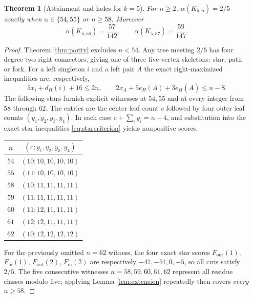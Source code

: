 \documentclass[11pt,a4paper]{article}
\newtheorem{theorem}{Theorem}[section]
\newcommand{\al}{\alpha}
\newcommand{\KK}[2]{K_{#1,#2}}
\begin{document}
\begin{theorem}[Attainment and holes for $k=5$]\label{thm:k5}
For $n\ge2$, $\al(\KK{5}{n})=2/5$ exactly when $n\in\{54,55\}$ or $n\ge58$. Moreover
\[
\al(\KK{5}{56})=\frac{57}{142},\qquad\al(\KK{5}{57})=\frac{59}{147}.
\]
\end{theorem}
\begin{proof}
Theorem \ref{thm:parity} excludes $n<54$. Any tree meeting $2/5$ has four degree-two right connectors, giving one of three five-vertex skeletons: star, path or fork. For a left singleton $i$ and a left pair $A$ the exact right-maximized inequalities are, respectively,
\[
5x_i+d_H(i)+16\le2n,\qquad 2x_A+5e_H(A)+3e_H(\bar A)\le n-8.
\]
The following stars furnish explicit witnesses at $54,55$ and at every integer from $58$ through $62$. The entries are the center leaf count $c$ followed by four outer leaf counts $(y_1,y_2,y_3,y_4)$. In each case $c+\sum_i y_i=n-4$, and substitution into the exact star inequalities \eqref{eq:starcriterion} yields nonpositive scores.
\begin{center}
\begin{tabular}{c@{\qquad}c}
\toprule
$n$ & $(c;y_1,y_2,y_3,y_4)$\\
\midrule
$54$ & $(10;10,10,10,10)$\\
$55$ & $(11;10,10,10,10)$\\
$58$ & $(10;11,11,11,11)$\\
$59$ & $(11;11,11,11,11)$\\
$60$ & $(11;12,11,11,11)$\\
$61$ & $(12;12,11,11,11)$\\
$62$ & $(10;12,12,12,12)$\\
\bottomrule
\end{tabular}
\end{center}
For the previously omitted $n=62$ witness, the four exact star scores $F_{\mathrm{out}}(1)$, $F_{\mathrm{in}}(1)$, $F_{\mathrm{out}}(2)$, $F_{\mathrm{in}}(2)$ are respectively $-47,-54,0,-5$, so all cuts satisfy $2/5$. The five consecutive witnesses $n=58,59,60,61,62$ represent all residue classes modulo five; applying Lemma \ref{lem:extension} repeatedly then covers \emph{every} $n\ge58$.


\end{proof}
\end{document}
